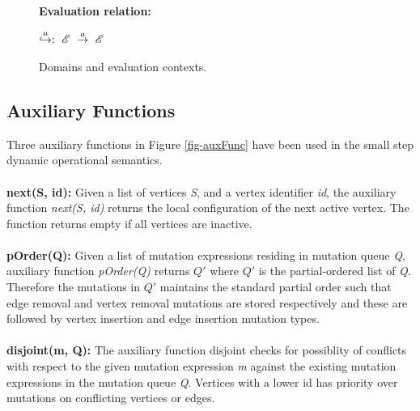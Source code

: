 \begin{figure}[h]
$\begin{array}{@{}l@{~}l@{\quad}l@{\!\!\!\!\!\!}r}
\ \\
\ \\
\end{array}
$

\textbf{Evaluation relation:}\\ 
\begin{center}

$\begin{array}{@{}l@{~}l@{\quad}l@{\!\!\!\!\!\!}r}
 \overset{a}{\reducesto}:~\mathscr{E}~\overset{a}{\rightarrow}~\mathscr{E}\\ 
\end{array}
$
\end{center}


\caption{Domains and evaluation contexts.}
\label{fig-domEv}
\end{figure}

\subsection{Auxiliary Functions}
\label{subsec:aux}


Three auxiliary functions in Figure \ref{fig-auxFunc} have been used in the small step dynamic operational semantics.
\ \\
\ \\
\textbf{next(S, id):} Given a list of vertices \emph{S}, and a vertex identifier \emph{id}, the auxiliary function \emph{next(S, id)} returns the local configuration of the next active vertex. The function returns empty if all vertices are inactive.
\ \\
\ \\
\textbf{pOrder(Q):} Given a list of mutation expressions residing in mutation queue \emph{Q}, auxiliary function \emph{pOrder(Q)} returns \emph{$Q'$} where \emph{$Q'$} is the partial-ordered list of \emph{Q}. Therefore the mutations in \emph{$Q'$} maintains the standard partial order \cite{Pregel2010} such that edge removal and vertex removal mutations are stored respectively and these are followed by vertex insertion and edge insertion mutation types. 
\ \\
\ \\
\textbf{disjoint(m, Q):} The auxiliary function disjoint checks for possiblity of conflicts with respect to the given mutation expression \emph{m} against the existing mutation expressions in the mutation queue \emph{Q}. Vertices with a lower id has priority over mutations on conflicting vertices or edges.


